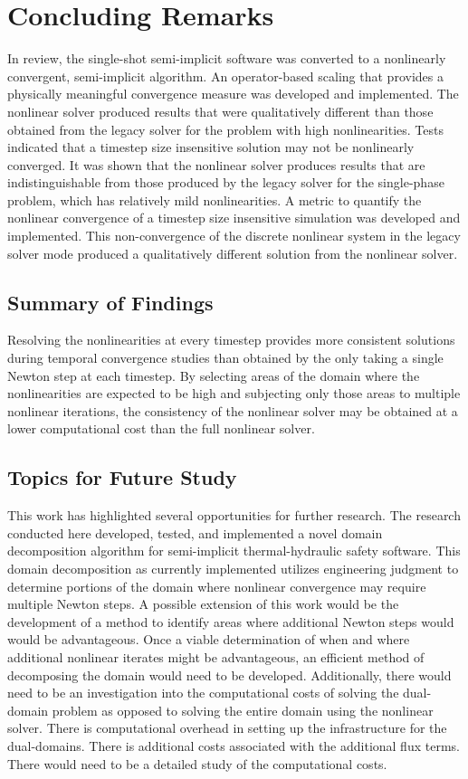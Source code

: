 \chapter{Concluding Remarks}
\label{chap:end}
In review, the single-shot semi-implicit \cobra{} software was converted to a nonlinearly convergent, semi-implicit algorithm.
An operator-based scaling that provides a physically meaningful convergence measure was developed and implemented.
The nonlinear solver produced results that were qualitatively different than those obtained from the legacy solver for the problem with high nonlinearities.
Tests indicated that a timestep size insensitive solution may not be nonlinearly converged.
It was shown that the nonlinear solver produces results that are indistinguishable from those produced by the legacy solver for the single-phase problem, which has relatively mild nonlinearities.
A metric to quantify the nonlinear convergence of a timestep size insensitive simulation was developed and implemented.
This non-convergence of the discrete nonlinear system in the legacy solver mode produced a qualitatively different solution from the nonlinear solver.

\section{Summary of Findings}
\label{sect:end:summary}
Resolving the nonlinearities at every timestep provides more consistent solutions during temporal convergence studies than obtained by the only taking a single Newton step at each timestep.
By selecting areas of the domain where the nonlinearities are expected to be high and subjecting only those areas to multiple nonlinear iterations, the consistency of the nonlinear solver may be obtained at a lower computational cost than the full nonlinear solver.

\section{Topics for Future Study}
\label{sect:end:future}
This work has highlighted several opportunities for further research.
The research conducted here developed, tested, and implemented a novel domain decomposition algorithm for semi-implicit thermal-hydraulic safety software.
This domain decomposition as currently implemented utilizes engineering judgment to determine portions of the domain where nonlinear convergence may require multiple Newton steps.
A possible extension of this work would be the development of a method to identify areas where additional Newton steps would would be advantageous.
Once a viable determination of when and where additional nonlinear iterates might be advantageous, an efficient method of decomposing the domain would need to be developed.
Additionally, there would need to be an investigation into the computational costs of solving the dual-domain problem as opposed to solving the entire domain using the nonlinear solver.
There is computational overhead in setting up the infrastructure for the dual-domains.
There is additional costs associated with the additional flux terms.
There would need to be a detailed study of the computational costs.


